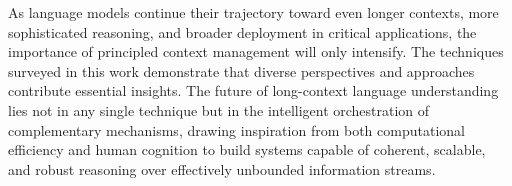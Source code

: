 \documentclass[11pt,letterpaper]{article}
\begin{document}
As language models continue their trajectory toward even longer contexts, more sophisticated reasoning, and broader deployment in critical applications, the importance of principled context management will only intensify. The techniques surveyed in this work demonstrate that diverse perspectives and approaches contribute essential insights. The future of long-context language understanding lies not in any single technique but in the intelligent orchestration of complementary mechanisms, drawing inspiration from both computational efficiency and human cognition to build systems capable of coherent, scalable, and robust reasoning over effectively unbounded information streams.



\end{document}
